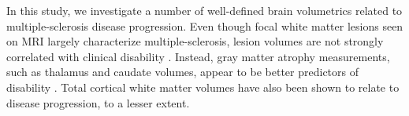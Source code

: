 In this study, we investigate a number of well-defined brain volumetrics related to multiple-sclerosis disease progression. Even though focal white matter lesions seen on MRI largely characterize multiple-sclerosis, lesion volumes are not strongly correlated with clinical disability \cite{lesions1,lesions2,lesions3}. Instead, gray matter atrophy measurements, such as thalamus \cite{thal1,thal2,thal3,thal4} and caudate \cite{caud1,caud2} volumes, appear to be better predictors of disability \cite{gm1,gm2,gm3,gm4}. Total cortical white matter volumes \cite{white1} have also been shown to relate to disease progression, to a lesser extent. %